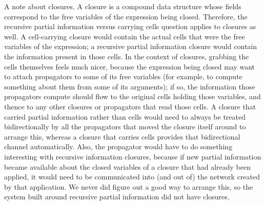 \documentclass[12pt,letterpaper]{article}
\begin{document}
A note about closures.  A closure is a compound data structure whose
fields correspond to the free variables of the expression being
closed.  Therefore, the recursive partial information versus carrying
cells question applies to closures as well.  A cell-carrying closure
would contain the actual cells that were the free variables of the
expression; a recursive partial information closure would contain the
information present in those cells.  In the context of closures,
grabbing the cells themselves feels much nicer, because the expression
being closed may want to attach propagators to some of its free
variables (for example, to compute something about them from some of
its arguments); if so, the information those propagators compute
should flow to the original cells holding those variables, and thence
to any other closures or propagators that read those cells.  A closure
that carried partial information rather than cells would need to
always be treated bidirectionally by all the propagators that moved
the closure itself around to arrange this, whereas a closure that
carries cells provides that bidirectional channel automatically.
  Also, the  propagator would
have to do something interesting with recursive information closures,
because if new partial information became available about the closed
variables of a closure that had already been applied, it would need to
be communicated into (and out of) the network created by that
application.  We never did figure out a good way to arrange this, so
the system built around recursive partial information did not have
closures.
\end{document}
